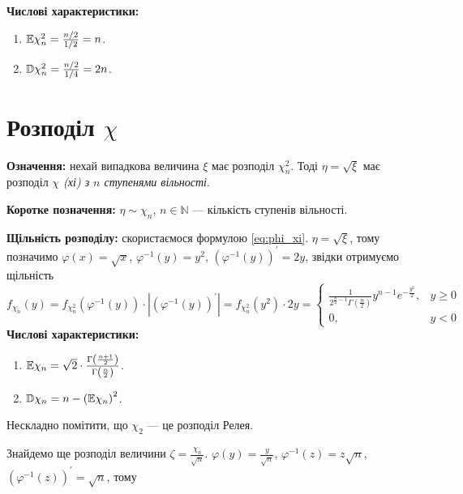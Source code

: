 \noindent\textbf{Числові характеристики:}
\begin{enumerate}
    \item $\mathbb{E}\chi_n^2 = \frac{n/2}{1/2} = n$.
    \item $\mathbb{D}\chi_n^2 = \frac{n/2}{1/4} = 2n$.
\end{enumerate}

\section{Розподіл \texorpdfstring{$\chi$}{x}}
\noindent\textbf{Означення:} нехай випадкова величина $\xi$ має розподіл $\chi_n^2$.
Тоді $\eta = \sqrt{\xi}$ має розподіл
\emph{$\chi$ (хі) з $n$ ступенями вільності}.

\noindent\textbf{Коротке позначення:} $\eta \sim \chi_n$, $n\in\mathbb{N}$ --- кількість ступенів вільності.

\noindent\textbf{Щільність розподілу:} скористаємося формулою \eqref{eq:phi_xi}. $\eta = \sqrt{\xi}$, тому позначимо $\varphi(x) = \sqrt{x}$, $\varphi^{-1}(y) = y^2$,
$\left( \varphi^{-1}(y) \right)^{\prime} = 2y$, звідки отримуємо щільність
\begin{equation*}
    f_{\chi_n}(y) = f_{\chi_n^2}\left(\varphi^{-1} (y)\right) \cdot \left|\left(\varphi^{-1} (y) \right)^{\prime}\right| =
f_{\chi_n^2}(y^2) \cdot 2y = 
\begin{cases}
    \frac{1}{2^{\frac{n}{2} - 1} \Gamma\left(\frac{n}{2}\right)} y^{n-1} e^{-\frac{y^2}{2}}, & y \geq 0 \\
    0, & y < 0
\end{cases}
\end{equation*}
\noindent\textbf{Числові характеристики:}
\begin{enumerate}
    \item $\mathbb{E}\chi_n = \sqrt{2} \cdot \frac{\Gamma\left(\frac{n+1}{2}\right)}{\Gamma\left(\frac{n}{2}\right)}$.
    \item $\mathbb{D}\chi_n = n - \left( \mathbb{E}\chi_n \right)^2$.
\end{enumerate}

\begin{remark}
    Нескладно помітити, що $\chi_2$ --- це розподіл Релея. 
\end{remark} 

\noindent Знайдемо ще розподіл величини $\zeta = \frac{\chi_n}{\sqrt{n}}$. $\varphi(y) = \frac{y}{\sqrt{n}}$,
$\varphi^{-1}(z) = z \sqrt{n}$, 
$\left( \varphi^{-1}(z) \right)^{\prime} = \sqrt{n}$, тому

